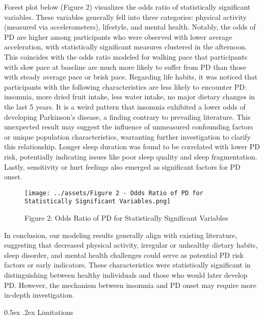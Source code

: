 \documentclass[12pt,]{article}
\makeatletter
\renewcommand\subsubsection{
  \@startsection{subsubsection}{3}{\z@}
    {-1.0ex\@plus -1ex \@minus -.2ex}%
    {0.5ex \@plus .2ex}%
    {\normalfont\normalsize\bf}} %
\makeatother
\begin{document}
Forest plot below (Figure 2) visualizes the odds ratio of statistically
significant variables. These variables generally fell into three
categories: physical activity (measured via accelerometers), lifestyle,
and mental health. Notably, the odds of PD are higher among participants
who were observed with lower average acceleration, with statistically
significant measures clustered in the afternoon. This coincides with the
odds ratio modeled for walking pace that participants with slow pace at
baseline are much more likely to suffer from PD than those with steady
average pace or brisk pace. Regarding life habits, it was noticed that
participants with the following characteristics are less likely to
encounter PD: insomnia, more dried fruit intake, less water intake, no
major dietary changes in the last 5 years. It is a weird pattern that
insomnia exhibited a lower odds of developing Parkinson's disease, a
finding contrary to prevailing literature. This unexpected result may
suggest the influence of unmeasured confounding factors or unique
population characteristics, warranting further investigation to clarify
this relationship. Longer sleep duration was found to be correlated with
lower PD risk, potentially indicating issues like poor sleep quality and
sleep fragmentation. Lastly, sensitivity or hurt feelings also emerged
as significant factors for PD onset.

\begin{figure}
\centering
\texttt{[image: ../assets/Figure 2 - Odds Ratio of PD for Statistically Significant Variables.png]}
\caption{Figure 2: Odds Ratio of PD for Statistically Significant
Variables}
\end{figure}

In conclusion, our modeling results generally align with existing
literature, suggesting that decreased physical activity, irregular or
unhealthy dietary habits, sleep disorder, and mental health challenges
could serve as potential PD risk factors or early indicators. These
characteristics were statistically significant in distinguishing between
healthy individuals and those who would later develop PD. However, the
mechanism between insomnia and PD onset may require more in-depth
investigation.

\hypertarget{limitations}{%
\subsubsection{Limitations}\label{limitations}}
\end{document}
